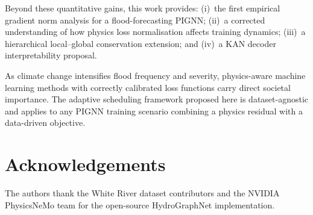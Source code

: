 \documentclass[conference]{IEEEtran}
\begin{document}
Beyond these quantitative gains, this work provides: (i)~the first
empirical gradient norm analysis for a flood-forecasting PIGNN;
(ii)~a corrected understanding of how physics loss normalisation affects
training dynamics; (iii)~a hierarchical local--global conservation
extension; and (iv)~a KAN decoder interpretability proposal.

As climate change intensifies flood frequency and severity, physics-aware
machine learning methods with correctly calibrated loss functions carry
direct societal importance. The adaptive scheduling framework proposed here
is dataset-agnostic and applies to any PIGNN training scenario combining
a physics residual with a data-driven objective.

\section*{Acknowledgements}
The authors thank the White River dataset contributors
\cite{dataset2025} and the NVIDIA PhysicsNeMo team
\cite{physicsnemo2024} for the open-source HydroGraphNet implementation.
\end{document}
